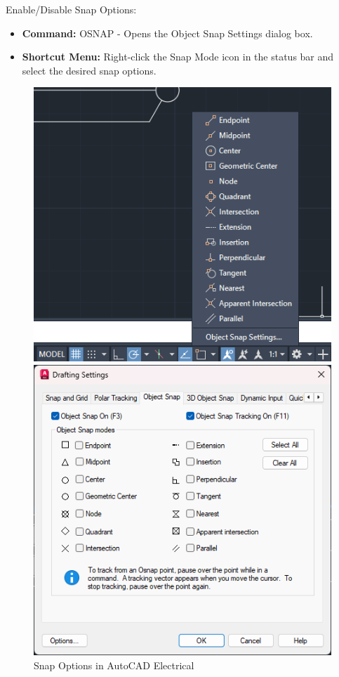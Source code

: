 \documentclass[12pt]{article}
\begin{document}
Enable/Disable Snap Options:
\begin{itemize}
    \item \textbf{Command:} OSNAP - Opens the Object Snap Settings dialog box.
    \item \textbf{Shortcut Menu:} Right-click the Snap Mode icon in the status bar and select the desired snap options.
\end{itemize}

\begin{figure}[H]
    \centering
    \begin{minipage}{0.45\textwidth}
        \centering
        \includegraphics[width=\textwidth]{snap.png}
        \caption{Snap Options in AutoCAD Electrical}
        \label{fig:snap_options}
    \end{minipage}\hfill
    \begin{minipage}{0.45\textwidth}
        \centering
        \includegraphics[width=\textwidth]{draft.png}

\end{minipage}
\end{figure}
\end{document}
